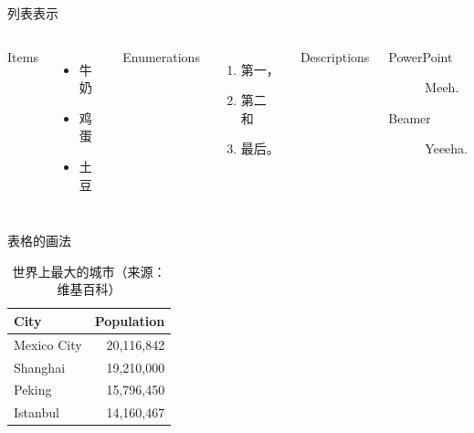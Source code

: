 \documentclass{kw-cn}
\begin{document}
\begin{frame}{列表表示}
	\begin{columns}[T,onlytextwidth]
		Items
		\begin{itemize}
			\item 牛奶 \item 鸡蛋 \item 土豆
		\end{itemize}
		
		Enumerations
		\begin{enumerate}
			\item 第一，\item 第二 和 \item 最后。
		\end{enumerate}
		
		Descriptions
		\begin{description}
			\item[PowerPoint] Meeh. \item[Beamer] Yeeeha.
		\end{description}
	\end{columns}
\end{frame}
\begin{frame}{表格的画法}
	\begin{table}
		\caption{世界上最大的城市（来源：维基百科）}
		\begin{tabular}{@{} lr @{}}
			\toprule
			City & Population\\
			\midrule
			Mexico City & 20,116,842\\
			Shanghai & 19,210,000\\
			Peking & 15,796,450\\
			Istanbul & 14,160,467\\
			\bottomrule
		\end{tabular}
	\end{table}
\end{frame}
\end{document}
